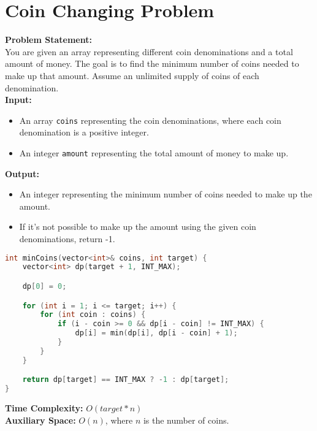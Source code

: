 \documentclass{article}
\begin{document}
\section{Coin Changing Problem}
\textbf{Problem Statement:}\\
You are given an array representing different coin denominations and a total amount of money. The goal is to find the minimum number of coins needed to make up that amount. Assume an unlimited supply of coins of each denomination.\\

\textbf{Input:}
\begin{itemize}
    \item An array \texttt{coins} representing the coin denominations, where each coin denomination is a positive integer.
    \item An integer \texttt{amount} representing the total amount of money to make up.
\end{itemize}

\textbf{Output:}
\begin{itemize}
    \item An integer representing the minimum number of coins needed to make up the amount.
    \item If it's not possible to make up the amount using the given coin denominations, return -1.
\end{itemize}
\begin{lstlisting}[language=C++, caption={Coin Changing Problem Dynamic Programming Approach Subprogram}, label=cppcode]
int minCoins(vector<int>& coins, int target) {
    vector<int> dp(target + 1, INT_MAX);

    dp[0] = 0;

    for (int i = 1; i <= target; i++) {
        for (int coin : coins) {
            if (i - coin >= 0 && dp[i - coin] != INT_MAX) {
                dp[i] = min(dp[i], dp[i - coin] + 1);
            }
        }
    }

    return dp[target] == INT_MAX ? -1 : dp[target];
}
\end{lstlisting}
\textbf{Time Complexity:}
 $O(target * n)$\\
\textbf{Auxiliary Space:}
 $O(n)$, where $n$ is the number of coins.\\\\
\end{document}
